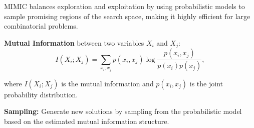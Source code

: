 MIMIC balances exploration and exploitation by using probabilistic models to sample promising regions of the search space, making it highly efficient for large combinatorial problems.

\textbf{Mutual Information} between two variables $X_i$ and $X_j$:
\[
I(X_i; X_j) = \sum_{x_i, x_j} p(x_i, x_j) \log \frac{p(x_i, x_j)}{p(x_i)p(x_j)},
\]

where $I(X_i; X_j)$ is the mutual information and $p(x_i, x_j)$ is the joint probability distribution.

\textbf{Sampling:} Generate new solutions by sampling from the probabilistic model based on the estimated mutual information structure.
